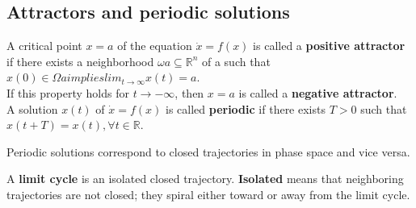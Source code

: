   \subsection{Attractors and periodic solutions}
    A critical point $x = a$ of the equation $\dot{x} = f(x)$ is called a
    \textbf{positive attractor} if there exists a neighborhood
    $\omega a \subseteq \mathbb{R}^n$ of a such that
    $x(0) \in \Omega a implies lim_{t \rightarrow \infty} x(t) = a$. \\
    If this property holds for $t \rightarrow - \infty$, then $x = a$ is called a
    \textbf{negative attractor}.\\
    A solution $x(t)$ of $\dot{x} = f(x)$ is called \textbf{periodic} if there exists
    $T > 0$ such that $x(t + T) = x(t), \forall t \in \mathbb{R}$.
    \begin{lemma}
      Periodic solutions correspond to closed trajectories in phase space and vice versa.
    \end{lemma}
    A \textbf{limit cycle} is an isolated closed trajectory. \textbf{Isolated}
    means that neighboring trajectories are not closed; they spiral either toward
    or away from the limit cycle. \\







